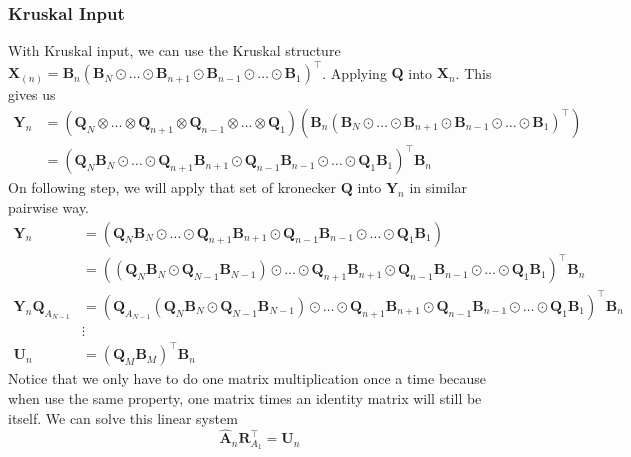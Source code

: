 \documentclass{article}
\newcommand{\mat}[1]{\mathbf{#1}}
\begin{document}
\subsubsection{Kruskal Input}

With Kruskal input, we can use the Kruskal structure $\mat{X}_{(n)} = \mat{B}_{n}(\mat{B}_{N} \odot \dots \odot \mat{B}_{n+1} \odot \mat{B}_{n-1}  \odot \dots \odot \mat{B}_{1})^\top$. 
Applying $\mat{Q}$ into $\mat{X}_n$. 
This gives us
\begin{align}
  \mat{Y}_n &= (\mat{Q}_N \otimes \dots \otimes \mat{Q}_{n+1} \otimes \mat{Q}_{n-1} \otimes \dots \otimes \mat{Q}_1)(\mat{B}_{n}(\mat{B}_{N} \odot \dots \odot \mat{B}_{n+1} \odot \mat{B}_{n-1}  \odot \dots \odot \mat{B}_{1})^\top) \nonumber \\
  &= (\mat{Q}_N\mat{B}_N \odot \dots \odot \mat{Q}_{n+1} \mat{B}_{n+1} \odot \mat{Q}_{n-1}\mat{B}_{n-1} \odot \dots \odot \mat{Q}_{1}\mat{B}_{1})^\top\mat{B}_n \nonumber   
\end{align}
On following step, we will apply that set of kronecker $\mat{Q}$ into $\mat{Y}_n$ in similar pairwise way.
\begin{align}
  \mat{Y}_n   &= (\mat{Q}_N\mat{B}_N \odot \dots \odot \mat{Q}_{n+1} \mat{B}_{n+1} \odot \mat{Q}_{n-1}\mat{B}_{n-1} \odot \dots \odot \mat{Q}_{1}\mat{B}_{1}) \nonumber   \\
      &= ((\mat{Q}_N\mat{B}_N \odot \mat{Q}_{N-1}\mat{B}_{N-1}) \odot \dots \odot \mat{Q}_{n+1} \mat{B}_{n+1} \odot \mat{Q}_{n-1}\mat{B}_{n-1} \odot \dots \odot \mat{Q}_{1}\mat{B}_{1})^\top\mat{B}_n \nonumber      \\
      \mat{Y}_n\mat{Q}_{A_{N-1}}  &= (\mat{Q}_{A_{N-1}}(\mat{Q}_N\mat{B}_N \odot \mat{Q}_{N-1}\mat{B}_{N-1}) \odot \dots \odot \mat{Q}_{n+1} \mat{B}_{n+1} \odot \mat{Q}_{n-1}\mat{B}_{n-1} \odot \dots \odot \mat{Q}_{1}\mat{B}_{1})^\top\mat{B}_n \nonumber \\
      & \vdots \nonumber \\
    \mat{U}_n  &= (\mat{Q}_{M}\mat{B}_M)^\top\mat{B}_n \nonumber  
\end{align}
Notice that we only have to do one matrix multiplication once a time because when use the same property, one matrix times an identity matrix will still be itself.
We can solve this linear system
\begin{equation}
  \mat{\hat{A}}_n\mat{R}_{A_1}^\top = \mat{U}_n 
\end{equation}
\end{document}
